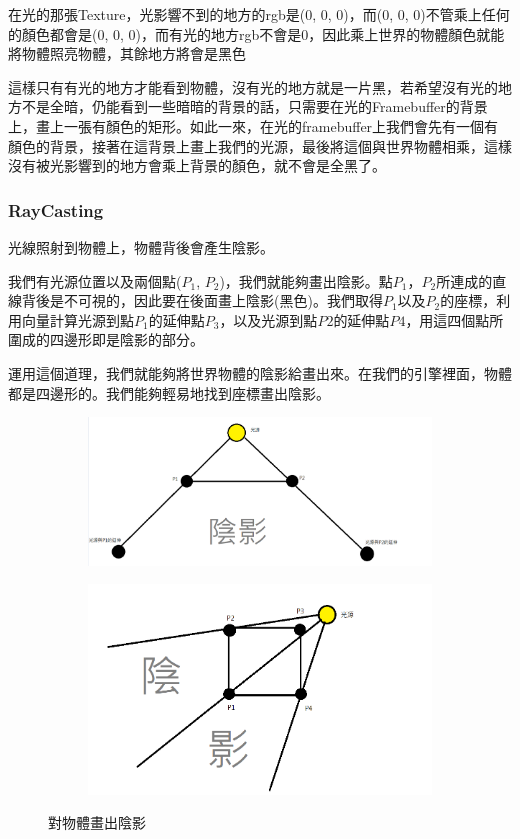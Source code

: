 在光的那張Texture，光影響不到的地方的rgb是(0, 0, 0)，而(0, 0, 0)不管乘上任何的顏色都會是(0, 0, 0)，而有光的地方rgb不會是0，因此乘上世界的物體顏色就能將物體照亮物體，其餘地方將會是黑色

這樣只有有光的地方才能看到物體，沒有光的地方就是一片黑，若希望沒有光的地方不是全暗，仍能看到一些暗暗的背景的話，只需要在光的Framebuffer的背景上，畫上一張有顏色的矩形。如此一來，在光的framebuffer上我們會先有一個有顏色的背景，接著在這背景上畫上我們的光源，最後將這個與世界物體相乘，這樣沒有被光影響到的地方會乘上背景的顏色，就不會是全黑了。

\subsubsection{RayCasting}

光線照射到物體上，物體背後會產生陰影。

我們有光源位置以及兩個點($P_1$, $P_2$)，我們就能夠畫出陰影。點$P_1$，$P_2$所連成的直線背後是不可視的，因此要在後面畫上陰影(黑色)。我們取得$P_1$以及$P_2$的座標，利用向量計算光源到點$P_1$的延伸點$P_3$，以及光源到點$P2$的延伸點$P4$，用這四個點所圍成的四邊形即是陰影的部分。

運用這個道理，我們就能夠將世界物體的陰影給畫出來。在我們的引擎裡面，物體都是四邊形的。我們能夠輕易地找到座標畫出陰影。

\begin{figure}[h]
    \begin{subfigure}[b]{0.5\linewidth}
        \includegraphics[width=\textwidth]{./resources/2D-Lighting/DrawShadow.png}
    \end{subfigure}
    \begin{subfigure}[b]{0.5\linewidth}
        \includegraphics[width=\textwidth]{./resources/2D-Lighting/DrawShadow2.png}
    \end{subfigure}
\caption{對物體畫出陰影}
\label{fig:DrawShadow}
\end{figure}


